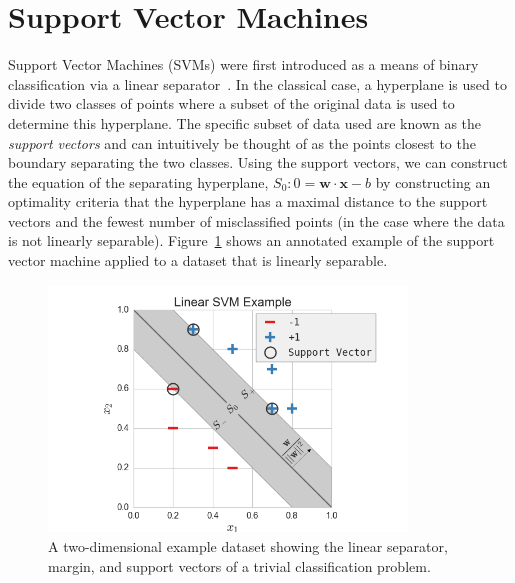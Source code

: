 \documentclass[12pt]{article}
\begin{document}

\section{Support Vector Machines}

Support Vector Machines (SVMs) were first introduced as a means of binary
classification via a linear separator~\cite{VapnikLerner1963}.
%
In the classical case, a hyperplane is used to divide two classes of points
where a subset of the original data is used to determine this hyperplane.
%
The specific subset of data used are known as the \emph{support vectors} and can
intuitively be thought of as the points closest to the boundary separating the
two classes.
%
Using the support vectors, we can construct the equation of the separating
hyperplane, $S_0: 0 = \mathbf{w} \cdot \mathbf{x} - b$ by constructing an
optimality criteria that the hyperplane has a maximal distance to the support
vectors and the fewest number of misclassified points (in the case where the
data is not linearly separable).
%
Figure~\ref{fig:svmExample} shows an annotated example of the support vector
machine applied to a dataset that is linearly separable.

\begin{figure}[!ht]
  \centering
  \includegraphics[width=0.85\textwidth]{figs/chap3/svmExample}
  \caption[Linear Support Vector Machine Example]{A two-dimensional example
  dataset showing the linear separator, margin, and support vectors of a trivial
  classification problem.}
  \label{fig:svmExample}
\end{figure}
\end{document}
